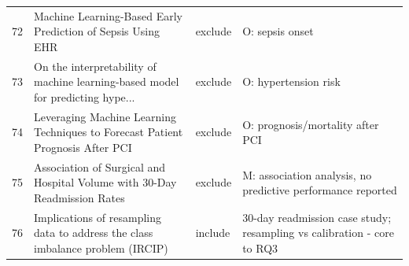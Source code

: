 \begin{longtable}{rp{4.9cm}p{1.35cm}p{4.6cm}}
72 & Machine Learning-Based Early Prediction of Sepsis Using EHR & exclude & O: sepsis onset \\
73 & On the interpretability of machine learning-based model for predicting hype... & exclude & O: hypertension risk \\
74 & Leveraging Machine Learning Techniques to Forecast Patient Prognosis After PCI & exclude & O: prognosis/mortality after PCI \\
75 & Association of Surgical and Hospital Volume with 30-Day Readmission Rates & exclude & M: association analysis, no predictive performance reported \\
76 & Implications of resampling data to address the class imbalance problem (IRCIP) & include & 30-day readmission case study; resampling vs calibration - core to RQ3 \\
\end{longtable}
\setlength{\tabcolsep}{6pt}